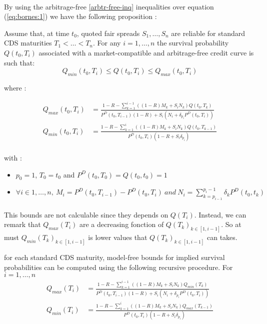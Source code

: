 \paragraph{}
By using the arbitrage-free \ref{arbtr-free-inq}
inequalities   over  equation   (\ref{eq:bornes:1})  we   have  the   following
proposition :
\begin{prop}
  Assume that, at time $t_0$, quoted fair spreads $S_1, \dots ,S_n$ are reliable
  for  standard  CDS  maturities  $T_1<\dots<T_n.$  For  any  $i=1,\dots,n$  the
  survival  probability $Q(t_0,T_i)$  associated  with  a market-compatible  and
  arbitrage-free credit curve is such that:
  \[
  Q_{min}(t_0,T_i) \leq Q(t_0,T_i) \leq Q_{max}(t_0,T_i)
  \]

  where :

  \begin{eqnarray*}
    Q_{max}(t_0,T_i) & =\frac
    {1 - R - \sum^{i - 1}_{k=1}( (1 - R) M_k + S_i N_k) Q(t_0,T_{k})}
    {P^D(t_0,T_{i - 1})(1 - R) + S_i(N_i + \delta_{p_i}P^D(t_0,T_i))}\\
    Q_{min}(t_0,T_i) &  =\frac{1 - R  - \sum^i_{k=1}  ( (1 -  R) M_k +  S_i N_k)
      Q(t_0,T_{k -1})}{P^D(t_0,T_{i})(1 - R + S_i \delta_{p_i})}\\
  \end{eqnarray*}

  with :
  \begin{itemize}
  \item $p_0=1$, $T_0=t_0$ and $P^D(t_0,T_0)=Q(t_0,t_0)=1$
  \item $\forall  i \in 1,\dots,n,\ M_i=P^D(t_0,T_{i-1})-P^D(t_0,T_i)\  and\ N_i =
    \sum^{p_i-1}_{k=p_{i-1}} \delta_k P^D(t_0,t_k)$ 
  \end{itemize}
\end{prop}

\paragraph{}
This bounds are  not calculable since they depends on  $Q(T_i)$. Instead, we can
remark    that     $Q_{max}(T_i)$    are     a    decreasing     fonction    of
$Q(T_k)_{k\in[1,i-1]}$. So  at must  $Q_{min}(T_k)_{k\in[1,i-1]}$ is  lower values
that $Q(T_k)_{k\in[1,i-1]}$ can takes.

\begin{prop}
\label{prop:3.2}
  for each standard CDS maturity, model-free bounds for implied survival probabilities can be computed using the following recursive procedure.
  For $i=1,\dots,n $
    \begin{eqnarray*}
    Q_{max}(T_i) & =\frac
    {1 - R - \sum^{i - 1}_{k=1}( (1 - R) M_k + S_i N_k) Q_{min}(T_{k})}
    {P^D(t_0,T_{i - 1})(1 - R) + S_i(N_i + \delta_{p_i}P^D(t_0,T_i))}\\
    Q_{min}(T_i) &  =\frac{1 - R  - \sum^i_{k=1}  ( (1 -  R) M_k +  S_i N_k)
      Q_{max}(T_{k -1})}{P^D(t_0,T_{i})(1 - R + S_i \delta_{p_i})}\\
  \end{eqnarray*}

\end{prop}


